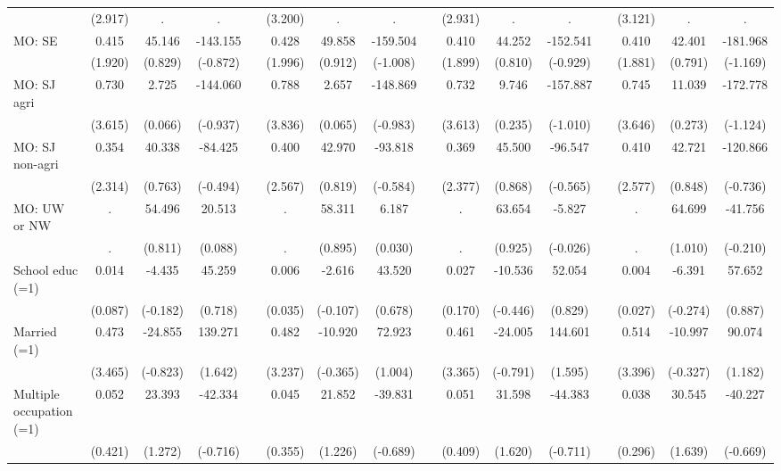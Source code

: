 {\begin{longtable}{@{\extracolsep{\fill}}lccccccccccccccc}
      & (2.917) & . & . &   & (3.200) & . & . &   & (2.931) & . & . &   & (3.121) & . & . \\
    MO: SE & 0.415 & 45.146 & -143.155 &   & 0.428 & 49.858 & -159.504 &   & 0.410 & 44.252 & -152.541 &   & 0.410 & 42.401 & -181.968 \\
      & (1.920) & (0.829) & (-0.872) &   & (1.996) & (0.912) & (-1.008) &   & (1.899) & (0.810) & (-0.929) &   & (1.881) & (0.791) & (-1.169) \\
    MO: SJ agri & 0.730 & 2.725 & -144.060 &   & 0.788 & 2.657 & -148.869 &   & 0.732 & 9.746 & -157.887 &   & 0.745 & 11.039 & -172.778 \\
      & (3.615) & (0.066) & (-0.937) &   & (3.836) & (0.065) & (-0.983) &   & (3.613) & (0.235) & (-1.010) &   & (3.646) & (0.273) & (-1.124) \\
    MO: SJ non-agri & 0.354 & 40.338 & -84.425 &   & 0.400 & 42.970 & -93.818 &   & 0.369 & 45.500 & -96.547 &   & 0.410 & 42.721 & -120.866 \\
      & (2.314) & (0.763) & (-0.494) &   & (2.567) & (0.819) & (-0.584) &   & (2.377) & (0.868) & (-0.565) &   & (2.577) & (0.848) & (-0.736) \\
    MO: UW or NW & . & 54.496 & 20.513 &   & . & 58.311 & 6.187 &   & . & 63.654 & -5.827 &   & . & 64.699 & -41.756 \\
      & . & (0.811) & (0.088) &   & . & (0.895) & (0.030) &   & . & (0.925) & (-0.026) &   & . & (1.010) & (-0.210) \\
    School educ (=1) & 0.014 & -4.435 & 45.259 &   & 0.006 & -2.616 & 43.520 &   & 0.027 & -10.536 & 52.054 &   & 0.004 & -6.391 & 57.652 \\
      & (0.087) & (-0.182) & (0.718) &   & (0.035) & (-0.107) & (0.678) &   & (0.170) & (-0.446) & (0.829) &   & (0.027) & (-0.274) & (0.887) \\
    Married (=1) & 0.473 & -24.855 & 139.271 &   & 0.482 & -10.920 & 72.923 &   & 0.461 & -24.005 & 144.601 &   & 0.514 & -10.997 & 90.074 \\
      & (3.465) & (-0.823) & (1.642) &   & (3.237) & (-0.365) & (1.004) &   & (3.365) & (-0.791) & (1.595) &   & (3.396) & (-0.327) & (1.182) \\
    Multiple occupation (=1) & 0.052 & 23.393 & -42.334 &   & 0.045 & 21.852 & -39.831 &   & 0.051 & 31.598 & -44.383 &   & 0.038 & 30.545 & -40.227 \\
      & (0.421) & (1.272) & (-0.716) &   & (0.355) & (1.226) & (-0.689) &   & (0.409) & (1.620) & (-0.711) &   & (0.296) & (1.639) & (-0.669) \\

\end{longtable}}
